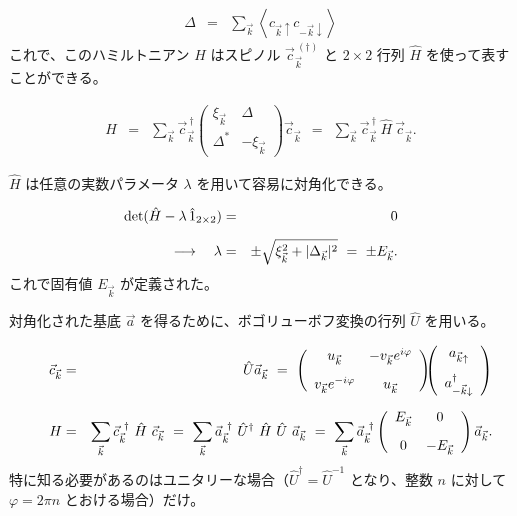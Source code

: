 \documentclass[uplatex,a4j,12pt,dvipdfmx]{jsarticle}
\begin{document}
\begin{eqnarray}
	\Delta
	&=&
	\sum_{\vec{k}}
	\left\langle
	c_{\vec{k} \uparrow}
	c_{-\vec{k} \downarrow}
	\right\rangle
\end{eqnarray}
%
これで、このハミルトニアン $H$ はスピノル $\vec{c}_{\vec{k}}^{\ (\dagger)}$ と $2 \times 2$ 行列 $\hat{H}$ を使って表すことができる。

\begin{eqnarray}
	H
	&=&
	\sum_{\vec{k}}
	\vec{c}^{\ \dagger}_{\vec{k}}
	\!\!
	\left(
	\begin{array}{cc}
			\xi_{\vec{k}} & \Delta         \\[3mm]
			\Delta^{*}    & -\xi_{\vec{k}}
		\end{array}
	\right)
	\!\!
	\vec{c}_{\vec{k}}
	\ \ = \ \
	\sum_{\vec{k}}
	\vec{c}^{\ \dagger}_{\vec{k}}
	\
	\hat{H}
	\
	\vec{c}_{\vec{k}}
	.
\end{eqnarray}
%

$\hat{H}$ は任意の実数パラメータ $\lambda$ を用いて容易に対角化できる。

\begin{eqnarray}
	{\rm det} ( \hat{H} - \lambda \ \! \hat{1}_{2 \times 2})
	&=&
	0
	\\[2mm]
	\longrightarrow
	\ \ \
	\lambda
	&=&
	\pm
	\sqrt{ \xi_{\vec{k}}^{2} + | \Delta_{\vec{k}} |^{2} }
	\ = \
	\pm E_{\vec{k}}
	.
\end{eqnarray}
%
これで固有値 $E_{\vec{k}}$ が定義された。

対角化された基底 $\vec{a}$ を得るために、ボゴリューボフ変換の行列 $\hat{U}$ を用いる。

\begin{eqnarray}
	\vec{c}_{\vec{k}}
	&=&
	\hat{U}
	\vec{a}_{\vec{k}}
	\ = \
	\left(
	\begin{array}{cc}
			u_{\vec{k}}                 & - v_{\vec{k}} e^{i \varphi}
			\\[3mm]
			v_{\vec{k}} e^{- i \varphi} & u_{\vec{k}}
		\end{array}
	\right)
	\!\!\!
	\left(
	\begin{array}{c}
			a_{\vec{k} \uparrow} \\[3mm]
			a_{-\vec{k} \downarrow}^{\dagger}
		\end{array}
	\right)
	\\[2mm]
	\hspace{5mm}
	H
	&=&
	\sum_{\vec{k}}
	\vec{c}^{\ \dagger}_{\vec{k}}
	\
	\hat{H}
	\
	\vec{c}_{\vec{k}}
	\ = \
	\sum_{\vec{k}}
	\vec{a}^{\ \dagger}_{\vec{k}}
	\
	\hat{U}^{\dagger}
	\
	\hat{H}
	\
	\hat{U}
	\
	\vec{a}_{\vec{k}}
	\ = \
	\sum_{\vec{k}}
	\vec{a}^{\ \dagger}_{\vec{k}}
	\left(
	\begin{array}{cc}
			E_{\vec{k}} & 0
			\\[3mm]
			0           & - E_{\vec{k}}
		\end{array}
	\right)
	\vec{a}_{\vec{k}}
	.
\end{eqnarray}
%
特に知る必要があるのはユニタリーな場合（$\hat{U}^{\dagger} = \hat{U}^{-1}$ となり、整数 $n$ に対して $\varphi=2 \pi n$ とおける場合）だけ。
\end{document}
